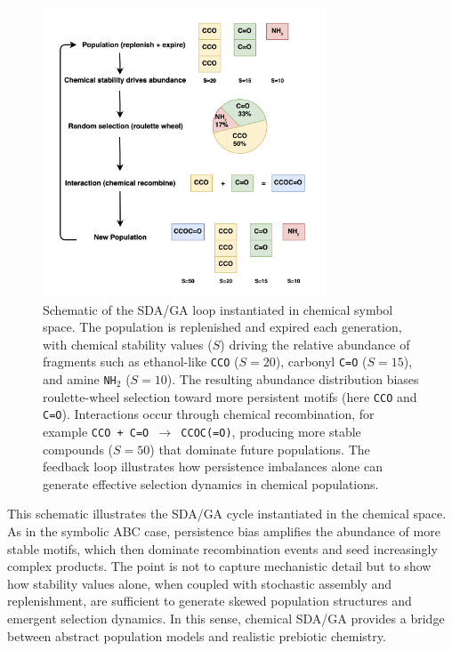 \documentclass[life,article,submit,pdftex,moreauthors]{Definitions/mdpi}
\begin{document}
\begin{figure}[H]
    \centering
    \includegraphics[width=0.75\textwidth]{SDA-Chem.png}
    \caption{Schematic of the SDA/GA loop instantiated in chemical symbol space. 
    The population is replenished and expired each generation, with chemical 
    stability values ($S$) driving the relative abundance of fragments such as 
    ethanol-like \texttt{CCO} ($S=20$), carbonyl \texttt{C=O} ($S=15$), and amine 
    \texttt{NH$_2$} ($S=10$). The resulting abundance distribution biases 
    roulette-wheel selection toward more persistent motifs (here \texttt{CCO} 
    and \texttt{C=O}). Interactions occur through chemical recombination, for 
    example \texttt{CCO + C=O $\to$ CCOC(=O)}, producing more stable compounds 
    ($S=50$) that dominate future populations. The feedback loop illustrates how 
    persistence imbalances alone can generate effective selection dynamics in 
    chemical populations.}
    \label{fig:sda-chem-loop}
\end{figure}

This schematic illustrates the SDA/GA cycle instantiated in the chemical space. As in the symbolic ABC case, persistence bias amplifies the abundance of more stable motifs, which then dominate recombination events and seed increasingly complex products. The point is not to capture mechanistic detail but to show how stability values alone, when coupled with stochastic assembly and replenishment, are sufficient to generate skewed population structures and emergent selection dynamics. In this sense, chemical SDA/GA provides a bridge between abstract population models and realistic prebiotic chemistry.
\end{document}

